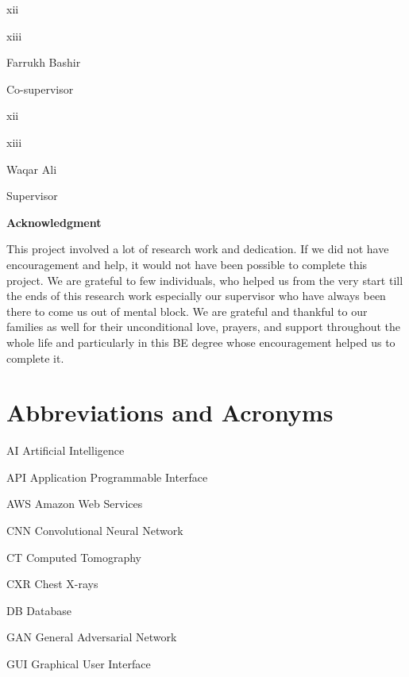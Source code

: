 \documentclass{article} %
\begin{document}
\noindent xii

\noindent xiii

\noindent 

\noindent 

\noindent 

\noindent Farrukh Bashir

\noindent Co-supervisor 

\noindent 

\noindent xii

\noindent xiii

\noindent 

\noindent 

\noindent 

\noindent Waqar Ali

\noindent  Supervisor \eject 

\noindent 

\noindent \textbf{Acknowledgment}

\noindent This project involved a lot of research work and dedication. If we did not have encouragement and help, it would not have been possible to complete this project. We are grateful to few individuals, who helped us from the very start till the ends of this research work especially our supervisor who have always been there to come us out of mental block. We are grateful and thankful to our families as well for their unconditional love, prayers, and support throughout the whole life and particularly in this BE degree whose encouragement helped us to complete it.

\noindent \eject 

\noindent \textbf{}

\noindent 
\section{Abbreviations and Acronyms}

\noindent AI  Artificial Intelligence 

\noindent API  Application Programmable Interface

\noindent AWS  Amazon Web Services

\noindent CNN  Convolutional Neural Network

\noindent CT  Computed Tomography

\noindent CXR  Chest X-rays

\noindent DB  Database

\noindent GAN  General Adversarial Network

\noindent GUI  Graphical User Interface
\end{document}
